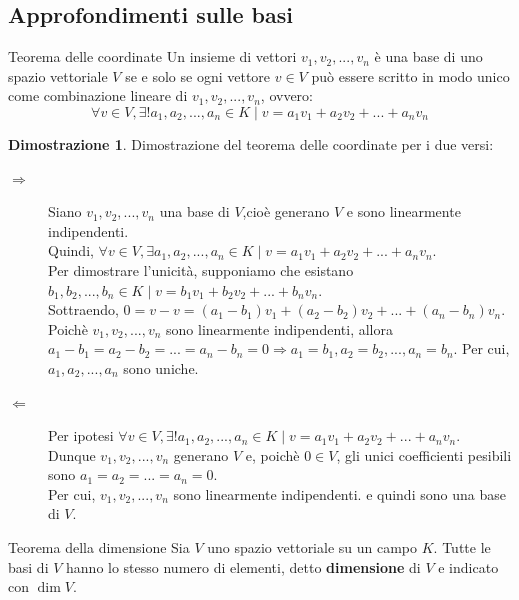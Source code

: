 \documentclass[a4paper]{article}
\theoremstyle{definition}
\newtheorem*{dimm}{Dimostrazione}
\begin{document}
\subsection{Approfondimenti sulle basi}
\begin{teo}{Teorema delle coordinate}{}
	Un insieme di vettori $v_1, v_2, ..., v_n$ è una base di uno spazio vettoriale $V$ se e solo se ogni vettore $v \in V$ può essere scritto in modo unico come combinazione lineare di $v_1, v_2, ..., v_n$, ovvero:
	\begin{equation*}
		\forall v \in V, \exists! a_1, a_2, ..., a_n \in K \mid v = a_1v_1 + a_2v_2 + ... + a_nv_n
	\end{equation*}
\end{teo}
\begin{dimm}
	Dimostrazione del teorema delle coordinate per i due versi:
	\begin{description}
		\item[$\Rightarrow$] Siano $v_1, v_2, ..., v_n$ una base di $V$,cioè generano $V$ e sono linearmente indipendenti. \\
		      Quindi, $\forall v \in V, \exists a_1, a_2, ..., a_n \in K \mid v = a_1v_1 + a_2v_2 + ... + a_nv_n$. \\
		      Per dimostrare l'unicità, supponiamo che esistano $b_1, b_2, ..., b_n \in K \mid v = b_1v_1 + b_2v_2 + ... + b_nv_n$. \\
		      Sottraendo, $0 = v - v = (a_1 - b_1)v_1 + (a_2 - b_2)v_2 + ... + (a_n - b_n)v_n$. \\
		      Poichè $v_1, v_2, ..., v_n$ sono linearmente indipendenti, allora $a_1 - b_1 = a_2 - b_2 = ... = a_n - b_n = 0 \Rightarrow a_1 = b_1, a_2 = b_2, ..., a_n = b_n$.
		      Per cui, $a_1, a_2, ..., a_n$ sono uniche.
		\item[$\Leftarrow$] Per ipotesi $\forall v \in V, \exists! a_1, a_2, ..., a_n \in K \mid v = a_1v_1 + a_2v_2 + ... + a_nv_n$. \\
		      Dunque $v_1, v_2, ..., v_n$ generano $V$ e, poichè $0 \in V$, gli unici coefficienti pesibili sono $a_1 = a_2 = ... = a_n = 0$. \\
		      Per cui, $v_1, v_2, ..., v_n$ sono linearmente indipendenti. e quindi sono una base di $V$.
	\end{description}
\end{dimm}
\begin{teo}{Teorema della dimensione}{}
	Sia $V$ uno spazio vettoriale su un campo $K$. Tutte le basi di $V$ hanno lo stesso numero di elementi, detto \textbf{dimensione} di $V$ e indicato con $\dim V$.
\end{teo}
\end{document}
